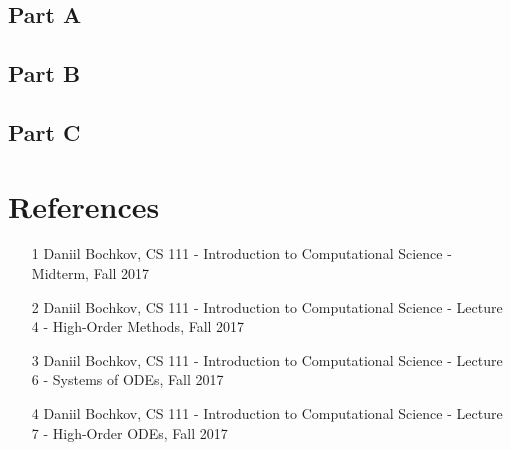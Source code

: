 \documentclass[12pt]{article}
\begin{document}
\subsection*{Part A}
\subsection*{Part B}
\subsection*{Part C}

\newpage
\clearpage
\setcounter{page}{1} \pagestyle{empty}
\section*{References}\label{sec::References}
\begin{itemize}
\item [1] Daniil Bochkov, CS 111 - Introduction to Computational Science - Midterm, Fall 2017
\item [2] Daniil Bochkov, CS 111 - Introduction to Computational Science - Lecture 4 - High-Order Methods, Fall 2017
\item [3] Daniil Bochkov, CS 111 - Introduction to Computational Science - Lecture 6 - Systems of ODEs,  Fall 2017
\item [4] Daniil Bochkov, CS 111 - Introduction to Computational Science - Lecture 7 - High-Order ODEs, Fall 2017
\end{itemize}
\end{document}
